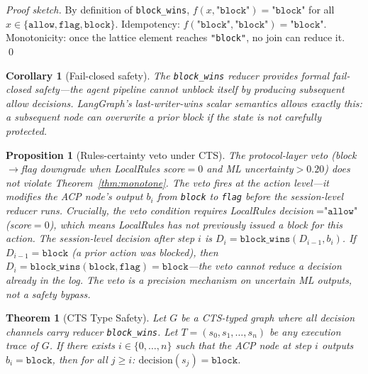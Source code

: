 \documentclass{article}
\newtheorem{proposition}{Proposition}
\newtheorem{theorem}{Theorem}
\newtheorem{corollary}{Corollary}
\begin{document}
\begin{proof}[Proof sketch]
By definition of \texttt{block\_wins}, $f(x, \texttt{"block"}) = \texttt{"block"}$ for all $x \in \{\texttt{allow}, \texttt{flag}, \texttt{block}\}$. Idempotency: $f(\texttt{"block"}, \texttt{"block"}) = \texttt{"block"}$. Monotonicity: once the lattice element reaches \texttt{"block"}, no join can reduce it. \qed
\end{proof}

\begin{corollary}[Fail-closed safety]
The \texttt{block\_wins} reducer provides formal \emph{fail-closed safety}---the agent pipeline cannot unblock itself by producing subsequent allow decisions. LangGraph's last-writer-wins scalar semantics allows exactly this: a subsequent node can overwrite a prior block if the state is not carefully protected.
\end{corollary}

\begin{proposition}[Rules-certainty veto under CTS]
\label{prop:veto}
The protocol-layer veto (block$\to$flag downgrade when LocalRules score$=0$ and ML uncertainty$>0.20$) does not violate Theorem~\ref{thm:monotone}. The veto fires at the \emph{action level}---it modifies the ACP node's output $b_i$ from \texttt{block} to \texttt{flag} before the session-level reducer runs. Crucially, the veto condition requires LocalRules decision$=\texttt{"allow"}$ (score$=0$), which means LocalRules has not previously issued a block for this action. The session-level decision after step $i$ is $D_i = \texttt{block\_wins}(D_{i-1}, b_i)$. If $D_{i-1} = \texttt{block}$ (a prior action was blocked), then $D_i = \texttt{block\_wins}(\texttt{block}, \texttt{flag}) = \texttt{block}$---the veto cannot reduce a decision already in the log. The veto is a precision mechanism on uncertain ML outputs, not a safety bypass.
\end{proposition}

\begin{theorem}[CTS Type Safety]
\label{thm:type_safety}
Let $G$ be a CTS-typed graph where all decision channels carry reducer \texttt{block\_wins}. Let $T = (s_0, s_1, \ldots, s_n)$ be any execution trace of $G$. If there exists $i \in \{0,\ldots,n\}$ such that the ACP node at step $i$ outputs $b_i = \texttt{block}$, then for all $j \geq i$: $\mathrm{decision}(s_j) = \texttt{block}$.
\end{theorem}
\end{document}
